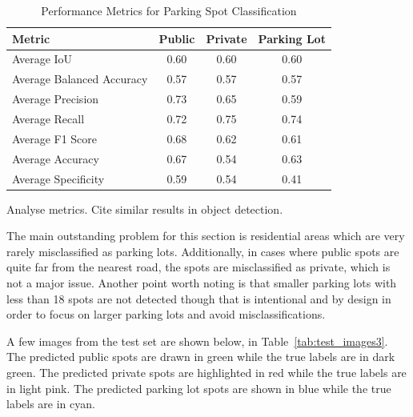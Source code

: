\begin{table}[htbp]
    \centering
    \begin{tabular}{|l|c|c|c|}
    \hline
    \textbf{Metric}               & \textbf{Public} & \textbf{Private} & \textbf{Parking Lot} \\ \hline
    Average IoU                  & 0.60             & 0.60             & 0.60              \\ \hline
    Average Balanced Accuracy    & 0.57             & 0.57             & 0.57              \\ \hline
    Average Precision            & 0.73             & 0.65             & 0.59              \\ \hline
    Average Recall               & 0.72             & 0.75             & 0.74              \\ \hline
    Average F1 Score             & 0.68             & 0.62             & 0.61              \\ \hline
    Average Accuracy             & 0.67             & 0.54             & 0.63              \\ \hline
    Average Specificity          & 0.59             & 0.54             & 0.41              \\ \hline
    \end{tabular}
    \caption{Performance Metrics for Parking Spot Classification}
    \label{tab:metrics3}
\end{table}

Analyse metrics. Cite similar results in object detection.

The main outstanding problem for this section is residential areas which are very rarely misclassified as parking lots.
Additionally, in cases where public spots are quite far from the nearest road, the spots are misclassified as private, which is not a major issue.
Another point worth noting is that smaller parking lots with less than 18 spots are not detected though that is intentional and by design in order to focus on larger parking lots and avoid misclassifications.

A few images from the test set are shown below, in Table~\ref{tab:test_images3}.
The predicted public spots are drawn in green while the true labels are in dark green. The predicted private spots are highlighted in red while the true labels are in light pink. The predicted parking lot spots are shown in blue while the true labels are in cyan.


